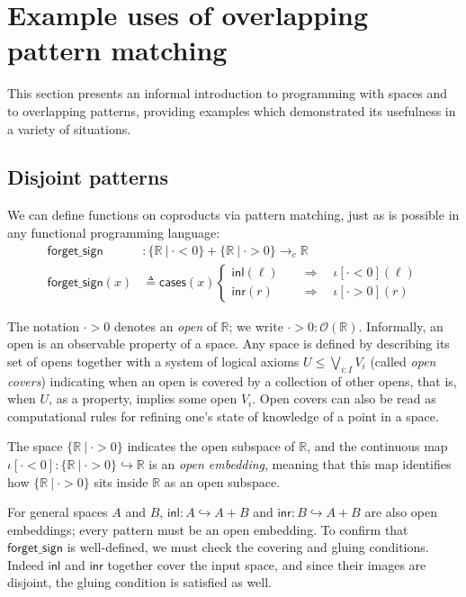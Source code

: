 \documentclass[conference]{IEEEtran}
\newcommand{\hookto}{\hookrightarrow}
\newcommand{\cto}{\to_c}
\newcommand{\R}{\mathbb{R}}
\newcommand{\suchthat}{\ |\ }
\newcommand{\Open}[1]{\mathcal{O}({#1})}
\newcommand{\oinclf}[1]{\iota[{#1}]}
\newcommand{\oincl}[2]{\oinclf{#1} \left({#2}\right)}
\newcommand{\Branch}{\Rightarrow}
\begin{document}
\section{Example uses of overlapping pattern matching}
\label{s:examples}

This section presents an informal introduction to programming with spaces and to overlapping patterns, providing examples which demonstrated its usefulness in a variety of situations.

\subsection{Disjoint patterns}

We can define functions on coproducts via pattern matching, just as is possible in any functional programming language:
\begin{align*}
\mathsf{forget\_sign} &: \{ \R \suchthat \cdot < 0 \} + \{ \R \suchthat \cdot > 0 \} \cto \R
\\ \mathsf{forget\_sign}(x) &\triangleq
  \mathsf{cases}(x)
  \begin{cases}
  \mathsf{inl}(\ell) \quad &\Branch \quad \oincl{\cdot < 0}{\ell}
  \\ \mathsf{inr}(r) \quad &\Branch \quad \oincl{\cdot > 0}{r}
  \end{cases}
\end{align*}

The notation $\cdot > 0$ denotes an \emph{open} of $\R$; we write $\cdot > 0 : \Open{\R}$. Informally, an open is an observable property of a space. Any space is defined by describing its set of opens together with a system of logical axioms $U \le \bigvee_{i : I} V_i$ (called \emph{open covers}) indicating when an open is covered by a collection of other opens, that is, when $U$, as a property, implies some open $V_i$. Open covers can also be read as computational rules for refining one's state of knowledge of a point in a space.

The space $\{ \R \suchthat \cdot > 0 \}$ indicates the open subspace of $\R$, and the continuous map $\oinclf{\cdot < 0} : \{ \R \suchthat \cdot > 0 \} \hookto \R$ is an \emph{open embedding}, meaning that this map identifies how $\{ \R \suchthat \cdot > 0 \}$ sits inside $\R$ as an open subspace.

For general spaces $A$ and $B$, $\mathsf{inl} : A \hookto A + B$ and $\mathsf{inr} : B \hookto A + B$ are also open embeddings; every pattern must be an open embedding. To confirm that $\mathsf{forget\_sign}$ is well-defined, we must check the covering and gluing conditions. Indeed $\mathsf{inl}$ and $\mathsf{inr}$ together cover the input space, and since their images are disjoint, the gluing condition is satisfied as well.
\end{document}
